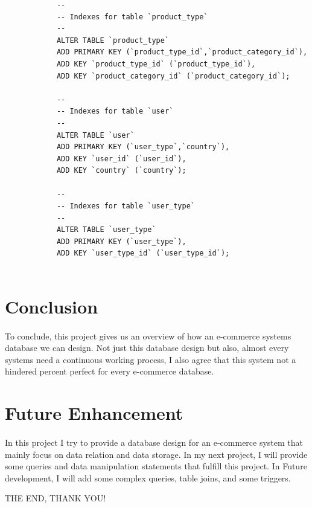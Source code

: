 \documentclass{article}
\begin{document}
\begin{verbatim}
			--
			-- Indexes for table `product_type`
			--
			ALTER TABLE `product_type`
			ADD PRIMARY KEY (`product_type_id`,`product_category_id`),
			ADD KEY `product_type_id` (`product_type_id`),
			ADD KEY `product_category_id` (`product_category_id`);
			
			--
			-- Indexes for table `user`
			--
			ALTER TABLE `user`
			ADD PRIMARY KEY (`user_type`,`country`),
			ADD KEY `user_id` (`user_id`),
			ADD KEY `country` (`country`);
			
			--
			-- Indexes for table `user_type`
			--
			ALTER TABLE `user_type`
			ADD PRIMARY KEY (`user_type`),
			ADD KEY `user_type_id` (`user_type_id`);
			
		\end{verbatim}
		\pagebreak
		\section{Conclusion}
		\paragraph{}
		To conclude, this project gives us an overview of how an e-commerce systems database we can design. Not just this database design but also, almost every systems need a continuous working process, I also agree that this system not a hindered percent perfect for every e-commerce database.
		
		\section{Future Enhancement}
		\paragraph{}
		In this project I try to provide a 
		database design for an e-commerce system that mainly focus on data relation and data storage.
		In my next project, I will provide some queries and data manipulation statements that fulfill this project. In Future development, I will add some complex queries, table joins, and some triggers.
		\linebreak
		\begin{center}
			\large{THE END, THANK YOU!}
		\end{center}
		\vspace{5cm}
		\printbibliography
\end{document}
